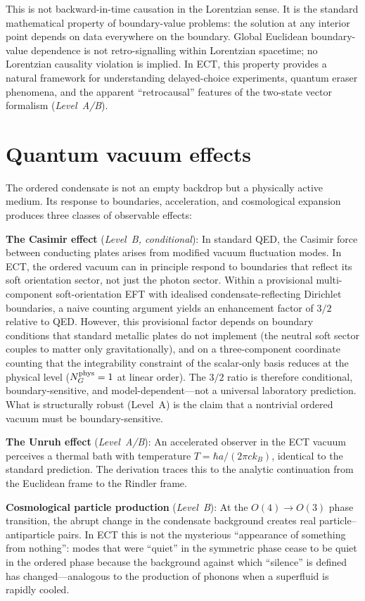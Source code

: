 \documentclass[11pt,a4paper]{article}
\begin{document}
This is not backward-in-time causation in the Lorentzian sense. It is the standard mathematical property of boundary-value problems: the solution at any interior point depends on data everywhere on the boundary. Global Euclidean boundary-value dependence is not retro-signalling within Lorentzian spacetime; no Lorentzian causality violation is implied. In ECT, this property provides a natural framework for understanding delayed-choice experiments, quantum eraser phenomena, and the apparent ``retrocausal'' features of the two-state vector formalism (\emph{Level~A/B}).


\section{Quantum vacuum effects}

The ordered condensate is not an empty backdrop but a physically active medium. Its response to boundaries, acceleration, and cosmological expansion produces three classes of observable effects:

\textbf{The Casimir effect} (\emph{Level~B, conditional}): In standard QED, the Casimir force between conducting plates arises from modified vacuum fluctuation modes. In ECT, the ordered vacuum can in principle respond to boundaries that reflect its soft orientation sector, not just the photon sector. Within a provisional multi-component soft-orientation EFT with idealised condensate-reflecting Dirichlet boundaries, a naive counting argument yields an enhancement factor of $3/2$ relative to QED. However, this provisional factor depends on boundary conditions that standard metallic plates do not implement (the neutral soft sector couples to matter only gravitationally), and on a three-component coordinate counting that the integrability constraint of the scalar-only basis reduces at the physical level ($N_G^{\rm phys}=1$ at linear order). The $3/2$ ratio is therefore conditional, boundary-sensitive, and model-dependent---not a universal laboratory prediction. What is structurally robust (Level~A) is the claim that a nontrivial ordered vacuum must be boundary-sensitive.

\textbf{The Unruh effect} (\emph{Level~A/B}): An accelerated observer in the ECT vacuum perceives a thermal bath with temperature $T = \hbar a/(2\pi c k_B)$, identical to the standard prediction. The derivation traces this to the analytic continuation from the Euclidean frame to the Rindler frame.

\textbf{Cosmological particle production} (\emph{Level~B}): At the $O(4) \to O(3)$ phase transition, the abrupt change in the condensate background creates real particle--antiparticle pairs. In ECT this is not the mysterious ``appearance of something from nothing'': modes that were ``quiet'' in the symmetric phase cease to be quiet in the ordered phase because the background against which ``silence'' is defined has changed---analogous to the production of phonons when a superfluid is rapidly cooled.
\end{document}
